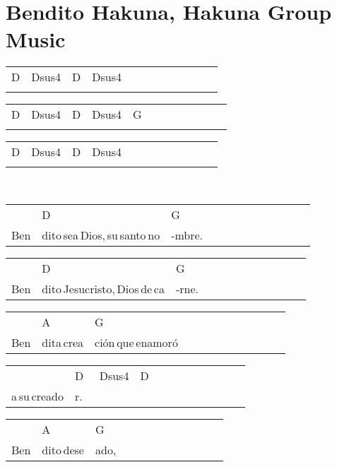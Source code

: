 \section*{Bendito Hakuna, Hakuna Group Music\hfill}
\begin{multicols}{2}
\noindent
\begin{minipage}{\columnwidth}
\noindent
\noindent
\begin{tabular}{llllllllllll}
D&Dsus4&D&Dsus4\\
\quad\quad&\quad\quad&\quad\quad&
\end{tabular}

\noindent
\begin{tabular}{llllllllllll}
D&Dsus4&D&Dsus4&G\\
\quad\quad&\quad\quad&\quad\quad&\quad\quad\quad&
\end{tabular}

\noindent
\begin{tabular}{llllllllllll}
D&Dsus4&D&Dsus4\\
\quad\quad&\quad\quad&\quad\quad&
\end{tabular}
\end{minipage}\\

\noindent
\begin{minipage}{\columnwidth}
\noindent
\noindent
\begin{tabular}{llllllllllll}
&D&G\\
Ben&dito\,sea\,Dios,\,su\,santo\,no&-mbre.
\end{tabular}

\noindent
\begin{tabular}{llllllllllll}
&D&G\\
Ben&dito\,Jesucristo,\,Dios\,de\,ca&-rne.
\end{tabular}

\noindent
\begin{tabular}{llllllllllll}
&A&G\\
Ben&dita\,crea&ción\,que\,enamoró
\end{tabular}

\noindent
\begin{tabular}{llllllllllll}
&D&Dsus4&D\\
a\,su\,creado&r.\,\,\,&\,\,\,&
\end{tabular}

\noindent
\begin{tabular}{llllllllllll}
&A&G\\
Ben&dito\,dese&ado,
\end{tabular}


\end{minipage}
\end{multicols}

